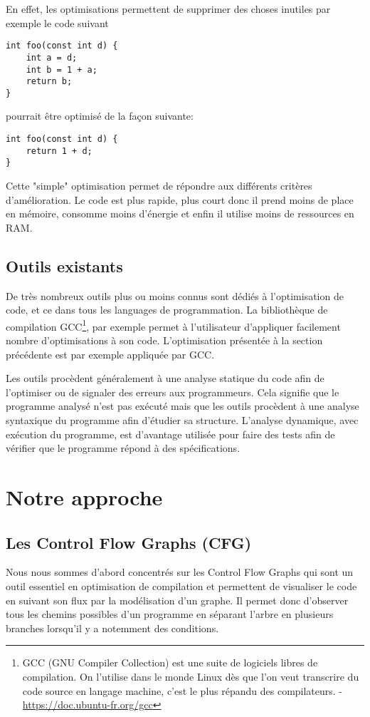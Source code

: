\documentclass[a4paper, titlepage]{report}
\begin{document}
En effet, les optimisations permettent de supprimer des choses inutiles par exemple le code suivant
\begin{lstlisting}
int foo(const int d) {
    int a = d;
    int b = 1 + a;
    return b;
}
\end{lstlisting}
pourrait être optimisé de la façon suivante:
\begin{lstlisting}
int foo(const int d) {
    return 1 + d;
}
\end{lstlisting}
Cette "simple" optimisation permet de répondre aux différents critères d'amélioration. Le code est plus rapide, plus court donc il prend moins de place en mémoire, consomme moins d'énergie et enfin il utilise moins de ressources en RAM.

\subsection{Outils existants}
De très nombreux outils plus ou moins connus sont dédiés à l'optimisation de code, et ce dans tous les languages de programmation. La bibliothèque de compilation GCC\footnote{GCC (GNU Compiler Collection) est une suite de logiciels libres de compilation. On l'utilise dans le monde Linux dès que l'on veut transcrire du code source en langage machine, c'est le plus répandu des compilateurs. - \url{https://doc.ubuntu-fr.org/gcc}}, par exemple permet à l'utilisateur d'appliquer facilement nombre d'optimisations à son code. L'optimisation présentée à la section précédente est par exemple appliquée par GCC.

Les outils procèdent généralement à une analyse statique du code afin de l'optimiser ou de signaler des erreurs aux programmeurs. Cela signifie que le programme analysé n'est pas exécuté mais que les outils procèdent à une analyse syntaxique du programme afin d'étudier sa structure. L'analyse dynamique, avec exécution du programme, est d'avantage utilisée pour faire des tests afin de vérifier que le programme répond à des spécifications.  


\section{Notre approche}
\subsection{Les Control Flow Graphs (CFG)}
Nous nous sommes d'abord concentrés sur les Control Flow Graphs qui sont un outil essentiel en optimisation de compilation et permettent de visualiser le code en suivant son flux par la modélisation d'un graphe. Il permet donc d'observer tous les chemins possibles d'un programme en séparant l'arbre en plusieurs branches lorsqu'il y a notemment des conditions.
\end{document}
